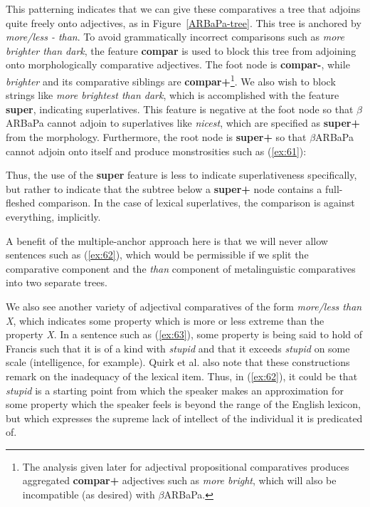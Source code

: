 This patterning indicates that we can give these comparatives a tree 
that adjoins quite freely onto adjectives, as in 
Figure~\ref{ARBaPa-tree}.  This tree is anchored by {\it more/less - than}.  To avoid grammatically incorrect comparisons such as {\it more brighter than dark}, the feature {\bf compar} is used to block this 
tree from adjoining onto morphologically comparative adjectives.  The 
foot node is {\bf compar-}, while {\it brighter} and its comparative 
siblings are {\bf compar+}\footnote {The analysis given later for adjectival propositional comparatives produces aggregated {\bf compar+} adjectives such as {\it more bright}, which will also be incompatible (as desired) with $\beta$ARBaPa.}.  We also wish to block 
strings like {\it more brightest than dark}, which is accomplished 
with the feature {\bf super}, indicating superlatives.  This feature 
is negative at the foot node so that $\beta$ARBaPa cannot adjoin to 
superlatives like {\it nicest}, which are specified as {\bf super+} 
from the morphology.  Furthermore, the root node is {\bf super+} so that $\beta$ARBaPa cannot adjoin onto itself and produce 
monstrosities such as (\ref{ex:61}): 
 
\beginsentences
{}\label{ex:61} 
\endsentences

 
\noindent Thus, the use of the {\bf super} feature is less to indicate 
superlativeness specifically, but rather to indicate that the subtree 
below a {\bf super+} node contains a full-fleshed comparison.  In the 
case of lexical superlatives, the comparison is against everything, 
implicitly. 
 
A benefit of the multiple-anchor approach here is that we will never 
allow sentences such as (\ref{ex:62}), which would be permissible if we 
split the comparative component and the {\it than} component of 
metalinguistic comparatives into two separate trees. 
 
\beginsentences
{}\label{ex:62} 
\endsentences

 
We also see another variety of adjectival comparatives of the form {\it more/less than X}, which indicates some property which is more or less 
extreme than the property {\it X}.  In a sentence such as (\ref{ex:63}), 
some property is being said to hold of Francis such that it is of a 
kind with {\it stupid} and that it exceeds {\it stupid} on some scale 
(intelligence, for example).  Quirk et al. also note that these 
constructions remark on the inadequacy of the lexical item.  Thus, in 
(\ref{ex:62}), it could be that {\it stupid} is a starting point from which 
the speaker makes an approximation for some property which the speaker 
feels is beyond the range of the English lexicon, but which expresses 
the supreme lack of intellect of the individual it is predicated of. 
 
